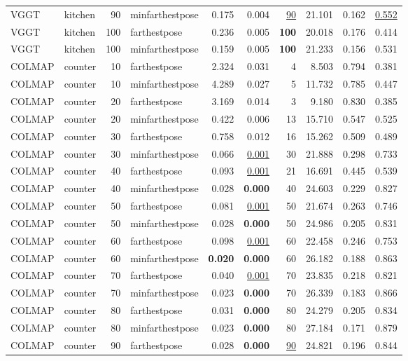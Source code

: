 \begin{table}[H]
\begin{tabular}{llrlrrrrrr}
VGGT & kitchen & 90 & minfarthestpose & 0.175 & 0.004 & \underline{90} & 21.101 & 0.162 & \underline{0.552} \\
VGGT & kitchen & 100 & farthestpose & 0.236 & 0.005 & \textbf{100} & 20.018 & 0.176 & 0.414 \\
VGGT & kitchen & 100 & minfarthestpose & 0.159 & 0.005 & \textbf{100} & 21.233 & 0.156 & 0.531 \\
\midrule
COLMAP & counter & 10 & farthestpose & 2.324 & 0.031 & 4 & 8.503 & 0.794 & 0.381 \\
COLMAP & counter & 10 & minfarthestpose & 4.289 & 0.027 & 5 & 11.732 & 0.785 & 0.447 \\
COLMAP & counter & 20 & farthestpose & 3.169 & 0.014 & 3 & 9.180 & 0.830 & 0.385 \\
COLMAP & counter & 20 & minfarthestpose & 0.422 & 0.006 & 13 & 15.710 & 0.547 & 0.525 \\
COLMAP & counter & 30 & farthestpose & 0.758 & 0.012 & 16 & 15.262 & 0.509 & 0.489 \\
COLMAP & counter & 30 & minfarthestpose & 0.066 & \underline{0.001} & 30 & 21.888 & 0.298 & 0.733 \\
COLMAP & counter & 40 & farthestpose & 0.093 & \underline{0.001} & 21 & 16.691 & 0.445 & 0.539 \\
COLMAP & counter & 40 & minfarthestpose & 0.028 & \textbf{0.000} & 40 & 24.603 & 0.229 & 0.827 \\
COLMAP & counter & 50 & farthestpose & 0.081 & \underline{0.001} & 50 & 21.674 & 0.263 & 0.746 \\
COLMAP & counter & 50 & minfarthestpose & 0.028 & \textbf{0.000} & 50 & 24.986 & 0.205 & 0.831 \\
COLMAP & counter & 60 & farthestpose & 0.098 & \underline{0.001} & 60 & 22.458 & 0.246 & 0.753 \\
COLMAP & counter & 60 & minfarthestpose & \textbf{0.020} & \textbf{0.000} & 60 & 26.182 & 0.188 & 0.863 \\
COLMAP & counter & 70 & farthestpose & 0.040 & \underline{0.001} & 70 & 23.835 & 0.218 & 0.821 \\
COLMAP & counter & 70 & minfarthestpose & 0.023 & \textbf{0.000} & 70 & 26.339 & 0.183 & 0.866 \\
COLMAP & counter & 80 & farthestpose & 0.031 & \textbf{0.000} & 80 & 24.279 & 0.205 & 0.834 \\
COLMAP & counter & 80 & minfarthestpose & 0.023 & \textbf{0.000} & 80 & 27.184 & 0.171 & 0.879 \\
COLMAP & counter & 90 & farthestpose & 0.028 & \textbf{0.000} & \underline{90} & 24.821 & 0.196 & 0.844 \\

\end{tabular}
\end{table}
